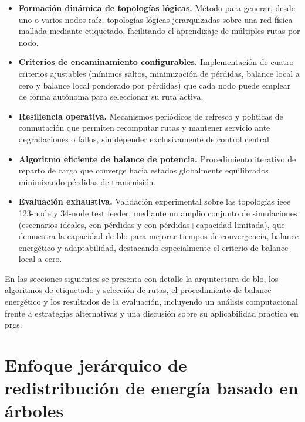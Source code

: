 \begin{itemize}
    \item \textbf{Formación dinámica de topologías lógicas.} Método para generar, desde uno o varios nodos raíz, topologías lógicas jerarquizadas sobre una red física mallada mediante etiquetado, facilitando el aprendizaje de múltiples rutas por nodo.
    
    \item \textbf{Criterios de encaminamiento configurables.} Implementación de cuatro criterios ajustables (mínimos saltos, minimización de pérdidas, balance local a cero y balance local ponderado por pérdidas) que cada nodo puede emplear de forma autónoma para seleccionar su ruta activa.
    
    \item \textbf{Resiliencia operativa.} Mecanismos periódicos de refresco y políticas de conmutación que permiten recomputar rutas y mantener servicio ante degradaciones o fallos, sin depender exclusivamente de control central.
    
    \item \textbf{Algoritmo eficiente de balance de potencia.} Procedimiento iterativo de reparto de carga que converge hacia estados globalmente equilibrados minimizando pérdidas de transmisión.
    
    \item \textbf{Evaluación exhaustiva.} Validación experimental sobre las topologías \gls{ieee} 123-node y 34-node test feeder,  mediante un amplio conjunto de simulaciones (escenarios ideales, con pérdidas y con pérdidas+capacidad limitada), que demuestra la capacidad de \gls{blo} para mejorar tiempos de convergencia, balance energético y adaptabilidad, destacando especialmente el criterio de balance local a cero.
    
\end{itemize}

En las secciones siguientes se presenta con detalle la arquitectura de \gls{blo}, los algoritmos de etiquetado y selección de rutas, el procedimiento de balance energético y los resultados de la evaluación, incluyendo un análisis computacional frente a estrategias alternativas y una discusión sobre su aplicabilidad práctica en \glspl{prg}.

\section{Enfoque jerárquico de redistribución de energía basado en árboles}
\label{sec:distribution}

